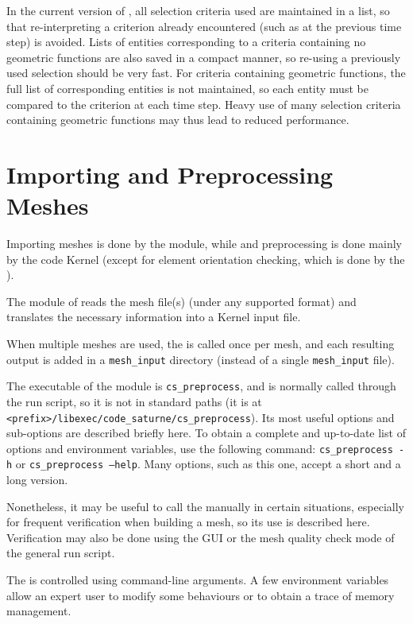 {{{In the current version of \CS, all selection criteria used
are maintained in a list, so that re-interpreting a criterion already
encountered (such as at the previous time step) is avoided.
Lists of entities corresponding to a criteria containing no geometric
functions are also saved in a compact manner, so re-using a previously
used selection should be very fast. For criteria containing geometric
functions, the full list of corresponding entities is not maintained,
so each entity must be compared to the criterion at each time step.
Heavy use of many selection criteria containing geometric functions
may thus lead to reduced performance.

\section{Importing and Preprocessing Meshes}

Importing meshes is done by the \pcs module, while and preprocessing
is done mainly by the code Kernel (except for element orientation
checking, which is done by the \pcs).

The \pcs module of \CS reads the
mesh file(s) (under any supported format) and translates the necessary
information into a Kernel input file.

When multiple meshes are used, the \pcs is called once per mesh,
and each resulting output is added in a \texttt{mesh\_input}
directory (instead of a single \texttt{mesh\_input} file).

The executable of the \pcs module is \texttt{cs\_preprocess}, and
is normally called through the run script, so it is not in standard paths
(it is at \texttt{<prefix>/libexec/code\_saturne/cs\_preprocess}).
Its most useful options and sub-options are described briefly here.
To obtain a complete and up-to-date list of options and environment
variables, use the following command:
\texttt{cs\_preprocess~-h} or \texttt{cs\_preprocess~--help}.
Many options, such as this one, accept a short and a long version.

Nonetheless, it may be useful to call the \pcs manually
in certain situations, especially for frequent verification when
building a mesh, so its use is described here. Verification
may also be done using the GUI or the mesh quality check mode
of the general run script.

The \pcs is controlled using command-line arguments.
A few environment variables allow an expert user to modify
some behaviours or to obtain a trace of memory management.

}}}
